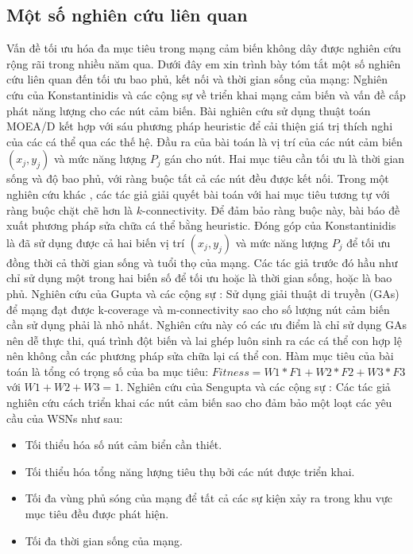 \documentclass{article}
\begin{document}
\subsection{Một số nghiên cứu liên quan}
Vấn đề tối ưu hóa đa mục tiêu trong mạng cảm biến không dây được nghiên cứu rộng rãi trong nhiều năm qua. Dưới đây em xin trình bày tóm tắt một số nghiên cứu liên quan đến tối ưu bao phủ, kết nối và thời gian sống của mạng:
\newline Nghiên cứu của Konstantinidis và các cộng sự \cite{konstantinidis2011multi} về triển khai mạng cảm biến  và vấn đề cấp phát năng lượng cho các nút cảm biến. Bài nghiên cứu sử dụng thuật toán \gls{MOEA/D} kết hợp với sáu phương pháp heuristic để cải thiện giá trị thích nghi của các cá thể qua các thế hệ. Đầu ra của bài toán là vị trí của các nút cảm biến $(x_j, y_j)$ và mức năng lượng $P_j$ gán cho nút. Hai mục tiêu cần tối ưu là  thời gian sống và độ bao phủ, với ràng buộc tất cả các nút đều được kết nối. Trong một nghiên cứu khác \cite{konstantinidis2011multi2}, các tác giả giải quyết bài toán với hai mục tiêu tương tự với ràng buộc chặt chẽ hơn là $k$-connectivity. Để đảm bảo ràng buộc này, bài báo đề xuất phương pháp sửa chữa cá thể bằng heuristic. Đóng góp của Konstantinidis là đã sử dụng được cả hai biến vị trí $(x_j, y_j)$ và mức năng lượng $P_j$ để tối ưu đồng thời cả thời gian sống và tuổi thọ của mạng. Các tác giả trước đó hầu như chỉ sử dụng một trong hai biến số để tối ưu hoặc là thời gian sống, hoặc là bao phủ.
\newline Nghiên cứu của Gupta và các cộng sự \cite{gupta2016genetic}: Sử dụng giải thuật di truyền (\gls{GAs}) để mạng đạt được k-coverage và m-connectivity sao cho  số lượng nút cảm biến cần sử dụng phải là nhỏ nhất. Nghiên cứu này có các  ưu điểm là chỉ sử dụng \gls{GAs} nên dễ thực thi, quá trình đột biến và lai ghép luôn sinh ra các cá thể con hợp lệ nên không cần các phương pháp sửa chữa lại cá thể con. Hàm mục tiêu của bài toán là tổng có trọng số của ba mục tiêu: $Fitness = W1*F1 + W2*F2 + W3*F3$ với $W1 + W2 + W3 = 1$.
\newline Nghiên cứu của Sengupta và các cộng sự \cite{sengupta2013multi}: Các tác giả nghiên cứu cách triển khai các nút cảm biến sao cho đảm bảo một loạt các yêu cầu của \gls{WSNs} như sau: 
\begin{itemize}
    \item Tối thiểu hóa số nút cảm biển cần thiết.
    \item Tối thiểu hóa tổng năng lượng tiêu thụ bởi các nút được triển khai.
    \item Tối đa vùng phủ sóng của mạng để tất cả các sự kiện xảy ra trong khu vực mục tiêu đều được phát hiện.
    \item Tối đa thời gian sống của mạng. 
\end{itemize}
\end{document}

